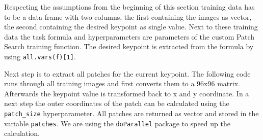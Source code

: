 \documentclass[]{article}
\newenvironment{Shaded}{\begin{snugshade}}{\end{snugshade}}
\newcommand{\KeywordTok}[1]{\textcolor[rgb]{0.13,0.29,0.53}{\textbf{{#1}}}}
\newcommand{\DataTypeTok}[1]{\textcolor[rgb]{0.13,0.29,0.53}{{#1}}}
\newcommand{\DecValTok}[1]{\textcolor[rgb]{0.00,0.00,0.81}{{#1}}}
\newcommand{\CharTok}[1]{\textcolor[rgb]{0.31,0.60,0.02}{{#1}}}
\newcommand{\StringTok}[1]{\textcolor[rgb]{0.31,0.60,0.02}{{#1}}}
\newcommand{\NormalTok}[1]{{#1}}
\begin{document}
Respecting the assumptions from the beginning of this section training
data has to be a data frame with two columns, the first containing the
images as vector, the second containing the desired keypoint as single
value. Next to these training data the task formula and hyperparameters
are parameters of the custom Patch Search training function. The desired
keypoint is extracted from the formula by using
\texttt{all.vars(f){[}1{]}}.

\begin{Shaded}
\end{Shaded}

Next step is to extract all patches for the current keypoint. The
following code runs through all training images and first converts them
to a 96x96 matrix. Afterwards the keypoint value is transformed back to
x and y coordinate. In a next step the outer coordinates of the patch
can be calculated using the \texttt{patch\_size} hyperparameter. All
patches are returned as vector and stored in the variable
\texttt{patches}. We are using the \texttt{doParallel} package to speed
up the calculation.
\end{document}
